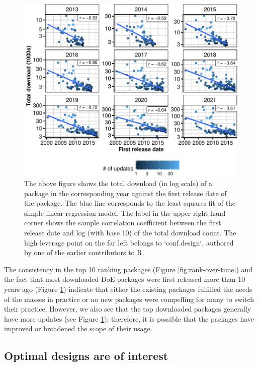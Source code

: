 \begin{figure}[htbp]

{\centering \includegraphics{figures/release-date-vs-download-1} 

}

\caption{The above figure shows the total download (in log scale) of a package in the corresponding year against the first release date of the package. The blue line corresponds to the least-squares fit of the simple linear regression model. The label in the upper right-hand corner shows the sample correlation coefficient between the first release date and log (with base 10) of the total download count. The high leverage point on the far left belongs to `conf.design`, authored by one of the earlier contributors to R.}\label{fig:release-date-vs-download}
\end{figure}

The consistency in the top 10 ranking packages (Figure \ref{fig:rank-over-time}) and the fact that most downloaded DoE packages were first released more than 10 years ago (Figure \ref{fig:release-date-vs-download}) indicate that either the existing packages fulfilled the needs of the masses in practice or no new packages were compelling for many to switch their practice. However, we also see that the top downloaded packages generally have more updates (see Figure \ref{fig:release-date-vs-download}); therefore, it is possible that the packages have improved or broadened the scope of their usage.

\hypertarget{optimal-designs-are-of-interest}{%
\subsection{Optimal designs are of interest}\label{optimal-designs-are-of-interest}}

